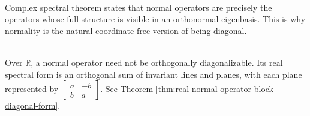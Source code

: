 \begin{perspective} \label{per:normal-operators-coordinate-free-diagonal} \\
Complex spectral theorem states that normal operators are precisely the operators whose full structure is visible in an orthonormal eigenbasis. This is why normality is the natural coordinate-free version of being diagonal.
\end{perspective}

\begin{perspective} \label{per:real-normal-operators-block-reference} \\
Over $\mathbb{R}$, a normal operator need not be orthogonally diagonalizable. Its real spectral form is an orthogonal sum of invariant lines and planes, with each plane represented by $\begin{bmatrix}a&-b\\ b&a\end{bmatrix}$. See Theorem \ref{thm:real-normal-operator-block-diagonal-form}.
\end{perspective}

